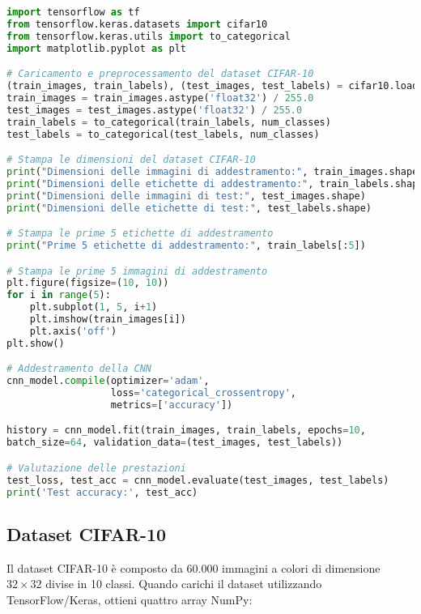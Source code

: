\documentclass{article}
\begin{document}
\begin{lstlisting}[language=Python, caption={Addestramento di una CNN su CIFAR-10}]
import tensorflow as tf
from tensorflow.keras.datasets import cifar10
from tensorflow.keras.utils import to_categorical
import matplotlib.pyplot as plt

# Caricamento e preprocessamento del dataset CIFAR-10
(train_images, train_labels), (test_images, test_labels) = cifar10.load_data()
train_images = train_images.astype('float32') / 255.0
test_images = test_images.astype('float32') / 255.0
train_labels = to_categorical(train_labels, num_classes)
test_labels = to_categorical(test_labels, num_classes)

# Stampa le dimensioni del dataset CIFAR-10
print("Dimensioni delle immagini di addestramento:", train_images.shape)
print("Dimensioni delle etichette di addestramento:", train_labels.shape)
print("Dimensioni delle immagini di test:", test_images.shape)
print("Dimensioni delle etichette di test:", test_labels.shape)

# Stampa le prime 5 etichette di addestramento
print("Prime 5 etichette di addestramento:", train_labels[:5])

# Stampa le prime 5 immagini di addestramento
plt.figure(figsize=(10, 10))
for i in range(5):
    plt.subplot(1, 5, i+1)
    plt.imshow(train_images[i])
    plt.axis('off')
plt.show()

# Addestramento della CNN
cnn_model.compile(optimizer='adam',
                  loss='categorical_crossentropy',
                  metrics=['accuracy'])

history = cnn_model.fit(train_images, train_labels, epochs=10, 
batch_size=64, validation_data=(test_images, test_labels))

# Valutazione delle prestazioni
test_loss, test_acc = cnn_model.evaluate(test_images, test_labels)
print('Test accuracy:', test_acc)

\end{lstlisting}

\subsection{Dataset CIFAR-10}
Il dataset CIFAR-10 è composto da 60.000 immagini a colori di dimensione $32 \times 32$ divise in 10 classi. Quando carichi il dataset utilizzando TensorFlow/Keras, ottieni quattro array NumPy:
\end{document}
